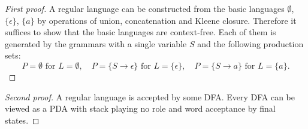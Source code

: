 \begin{proof}[First proof]
A regular language can be constructed from the basic languages $\emptyset$, $\{\epsilon\}$, $\{a\}$
by operations of union, concatenation and Kleene closure.
Therefore it suffices to show that the basic languages are context-free.
Each of them is generated by the grammars with a single variable $S$ and the following production sets:
\[
P = \emptyset \text{ for }L = \emptyset, \quad P = \{S \to \epsilon\} \text{ for }L = \{\epsilon\}, \quad P = \{S \to a\} \text{ for }L = \{a\}.
\]
\end{proof}

\begin{proof}[Second proof]
A regular language is accepted by some DFA. 
Every DFA can be viewed as a PDA with stack playing no role and word acceptance by final states.
\end{proof}

